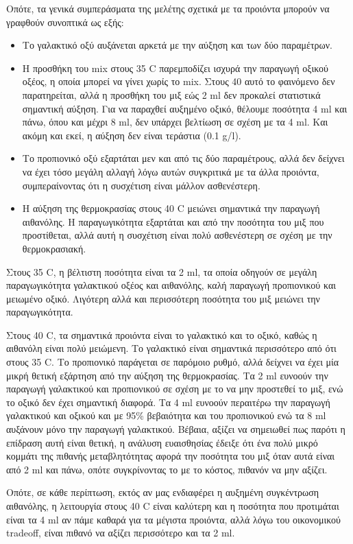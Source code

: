 \documentclass[11pt]{article}
\begin{document}
Οπότε, τα γενικά συμπεράσματα της μελέτης σχετικά με τα προιόντα μπορούν να γραφθούν συνοπτικά ως εξής:
\begin{itemize}
\item Το γαλακτικό οξύ αυξάνεται αρκετά με την αύξηση και των δύο παραμέτρων.
\item Η προσθήκη του mix στους 35 C παρεμποδίζει ισχυρά την παραγωγή οξικού οξέος, η οποία μπορεί να γίνει χωρίς το mix. Στους 40 αυτό το φαινόμενο δεν παρατηρείται, αλλά η προσθήκη του μιξ εώς 2 ml δεν προκαλεί στατιστικά σημαντική αύξηση. Για να παραχθεί αυξημένο οξικό, θέλουμε ποσότητα 4 ml και πάνω, όπου και μέχρι 8 ml, δεν υπάρχει βελτίωση σε σχέση με τα 4 ml. Και ακόμη και εκεί, η αύξηση δεν είναι τεράστια (0.1 g/l).
\item Το προπιονικό οξύ εξαρτάται μεν και από τις δύο παραμέτρους, αλλά δεν δείχνει να έχει τόσο μεγάλη αλλαγή λόγω αυτών συγκριτικά με τα άλλα προιόντα, συμπεραίνοντας ότι η συσχέτιση είναι μάλλον ασθενέστερη.
\item Η αύξηση της θερμοκρασίας στους 40 C μειώνει σημαντικά την παραγωγή αιθανόλης. Η παραγωγικότητα εξαρτάται και από την ποσότητα του μιξ που προστίθεται, αλλά αυτή η συσχέτιση είναι πολύ ασθενέστερη σε σχέση με την θερμοκρασιακή.
\end{itemize}

Στους 35 C, η βέλτιστη ποσότητα είναι τα 2 ml, τα οποία οδηγούν σε μεγάλη παραγωγικότητα γαλακτικού οξέος και αιθανόλης, καλή παραγωγή προπιονικού και μειωμένο οξικό. Λιγότερη αλλά και περισσότερη ποσότητα του μιξ μειώνει την παραγωγικότητα.

Στους 40 C, τα σημαντικά προιόντα είναι το γαλακτικό και το οξικό, καθώς η αιθανόλη είναι πολύ μειώμενη. Το γαλακτικό είναι σημαντικά περισσότερο από ότι στους 35 C. Το προπιονικό παράγεται σε παρόμοιο ρυθμό, αλλά δείχνει να έχει μία μικρή θετική εξάρτηση από την αύξηση της θερμοκρασίας. Τα 2 ml ευνοούν την παραγωγή γαλακτικού και προπιονικού σε σχέση με το να μην προστεθεί το μιξ, ενώ το οξικό δεν έχει σημαντική διαφορά. Τα 4 ml ευνοούν περαιτέρω την παραγωγή γαλακτικού και οξικού και με 95\% βεβαιότητα και του προπιονικού ενώ τα 8 ml αυξάνουν μόνο την παραγωγή γαλακτικού. Βέβαια, αξίζει να σημειωθεί πως παρότι η επίδραση αυτή είναι θετική, η ανάλυση ευαισθησίας έδειξε ότι ένα πολύ μικρό κομμάτι της πιθανής μεταβλητότητας αφορά την ποσότητα του μιξ όταν αυτά είναι από 2 ml και πάνω, οπότε συγκρίνοντας το με το κόστος, πιθανόν να μην αξίζει.

Οπότε, σε κάθε περίπτωση, εκτός αν μας ενδιαφέρει η αυξημένη συγκέντρωση αιθανόλης, η λειτουργία στους 40 C είναι καλύτερη και η ποσότητα που προτιμάται είναι τα 4 ml αν πάμε καθαρά για τα μέγιστα προιόντα, αλλά λόγω του οικονομικού tradeoff, είναι πιθανό να αξίζει περισσότερο και τα 2 ml.
\end{document}

